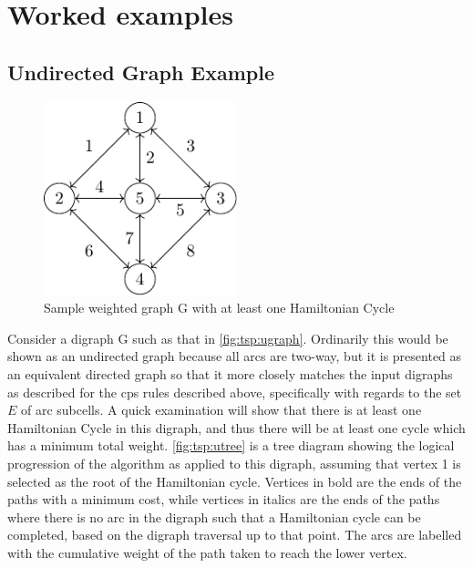 \section{\label{sec:tsp:example}Worked examples}

\subsection{Undirected Graph Example}

\begin{figure}
\centering
\includegraphics[width=0.5\textwidth]{chapters/tsp/figs/ugraph-figure0}
\caption{\label{fig:tsp:ugraph}Sample weighted graph G with at least one Hamiltonian Cycle}
\end{figure}

Consider a digraph G such as that in \autoref{fig:tsp:ugraph}.  Ordinarily this would be shown as an undirected graph because all arcs are two-way, but it is presented as an equivalent directed graph so that it more closely matches the input digraphs as described for the \gls{cps} rules described above, specifically with regards to the set \(E\) of arc subcells.  A quick examination will show that there is at least one Hamiltonian Cycle in this digraph, and thus there will be at least one cycle which has a minimum total weight.  \autoref{fig:tsp:utree} is a tree diagram showing the logical progression of the algorithm as applied to this digraph, assuming that vertex 1 is selected as the root of the Hamiltonian cycle.  Vertices in bold are the ends of the paths with a minimum cost, while vertices in italics are the ends of the paths where there is no arc in the digraph such that a Hamiltonian cycle can be completed, based on the digraph traversal up to that point.  The arcs are labelled with the cumulative weight of the path taken to reach the lower vertex.

